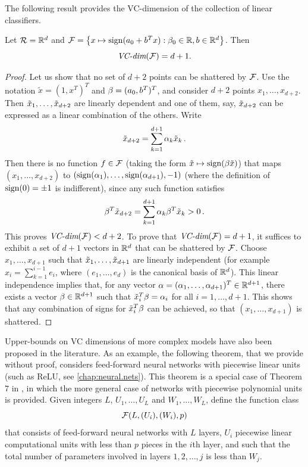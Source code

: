 The following result provides the VC-dimension of the collection of linear classifiers.
\begin{proposition}
\label{prop:vc.lin}
Let ${\mathcal R} = {\mathbb{R}}^d$ and ${\mathcal F} = \left\{ x \mapsto \operatorname{sign}(a_0 + b^Tx): \beta_0\in {\mathbb{R}}, b \in {\mathbb{R}}^d \right\}$. Then 
\[
\textit{VC-dim}({\mathcal F}) = d+1.
\]
\end{proposition}
\begin{proof}
Let us show that no set of $d+2$ points can be shattered by ${\mathcal F}$. Use the notation $\tilde x = (1, x^T)^T$ and $\beta = (a_0, b^T)^T$, and consider $d+2$ points $x_1, \ldots, x_{d+2}$. Then ${\tilde{x}}_{1}, \ldots, {\tilde{x}}_{d+2}$ are linearly dependent and one of them, say, ${\tilde{x}}_{d+2}$ can be expressed as a linear combination of the others. Write 
\[
 {\tilde{x}}_{d+2} = \sum_{k=1}^{d+1} \alpha_k {\tilde{x}}_{k}\,.
 \]
 Then there is no function $f\in {\mathcal F}$ (taking the form $\tilde x \mapsto \operatorname{sign}(\beta \tilde x)$) that maps $(x_{1}, \ldots, x_{d+2})$ to $(\operatorname{sign}(\alpha_1), \ldots, \operatorname{sign}(\alpha_{d+1}), -1)$ (where the definition of $\operatorname{sign}(0) = \pm 1$ is indifferent), since any such function satisfies
\[
\beta^T {\tilde{x}}_{d+2} = \sum_{k=1}^{d+1} \alpha_k \beta^T {\tilde{x}}_{k} > 0\,.
 \]
 This proves $\textit{VC-dim}({\mathcal F}) < d+2$. To prove that $\textit{VC-dim}({\mathcal F}) = d+1$, it suffices to exhibit a set of $d+1$ vectors in ${\mathbb{R}}^d$ that can be shattered by ${\mathcal F}$. Choose $x_{1}, \ldots, x_{d+1}$ such that  ${\tilde{x}}_{1}, \ldots, {\tilde{x}}_{d+1}$ are linearly independent (for example $x_{i} = \sum_{k=1}^{i-1} e_i$, where $(e_1, \ldots, e_d)$ is the canonical basis of ${\mathbb{R}}^d$). This linear independence implies that, for any vector $\alpha = (\alpha_1, \ldots, \alpha_{d+1})^T\in {\mathbb{R}}^{d+1}$, there exists a vector $\beta\in {\mathbb{R}}^{d+1}$ such that $\tilde x_i^T\beta = \alpha_i$ for all $i=1, \ldots, d+1$. This shows that any combination of signs for $\tilde x_i^T\beta$ can be achieved, so that $(x_1, \ldots, x_{d+1})$ is shattered.
\end{proof}

%
Upper-bounds on VC dimensions of more complex models have also been proposed in the literature. As an example, the following theorem, that we provide without proof, considers feed-forward neural networks with piecewise  linear units (such as ReLU, see \cref{chap:neural.nets}). This theorem is a special case of Theorem 7 in \citet{bartlett2019nearly}, in which the more general case of networks with piecewise polynomial units is provided. Given integers $L$, $U_1, \ldots, U_L$ and $W_1, \ldots, W_L$, define the function class 
\[
{\mathcal F}(L,(U_i), (W_i), p)
\]
 that consists of feed-forward neural networks with $L$ layers, $U_i$ piecewise linear computational units with less than $p$ pieces in the $i$th layer,  and such that the total number of parameters involved in layers $1,2, \ldots, j$ is less than $W_j$. 
 
